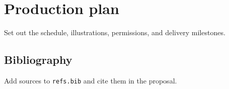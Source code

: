 \chapter{Production plan}
Set out the schedule, illustrations, permissions, and delivery milestones.
\section{Bibliography}
Add sources to \texttt{refs.bib} and cite them in the proposal.
